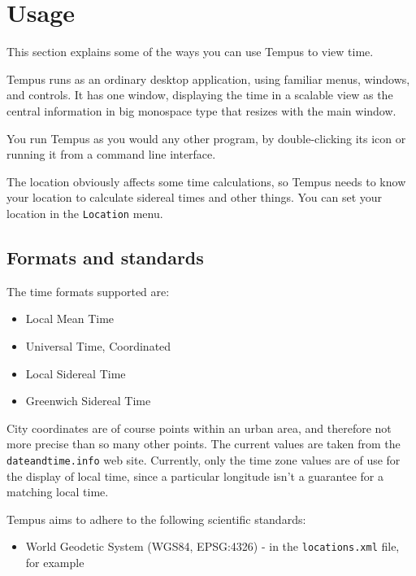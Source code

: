 \section{Usage}

This section explains some of the ways you can use Tempus to view time.

Tempus runs as an ordinary desktop application, using familiar menus, windows, and controls. It has one window, displaying the time in a scalable view as the central information in big monospace type that resizes with the main window.

You run Tempus as you would any other program, by double-clicking its icon or running it from a command line interface. 

The location obviously affects some time calculations, so Tempus needs to know your location to calculate sidereal times and other things. You can set your location in the \texttt{Location} menu.

\subsection{Formats and standards}

The time formats supported are:
\begin{itemize}
    \item Local Mean Time
    \item Universal Time, Coordinated
    \item Local Sidereal Time
    \item Greenwich Sidereal Time
\end{itemize}

City coordinates are of course points within an urban area, and therefore not more precise than so many other points. The current values are taken from the \texttt{dateandtime.info} web site. Currently, only the time zone values are of use for the display of local time, since a particular longitude isn't a guarantee for a matching local time.

Tempus aims to adhere to the following scientific standards:

\begin{itemize}
    \item World Geodetic System (WGS84, EPSG:4326) - in the \texttt{locations.xml} file, for example
\end{itemize}

